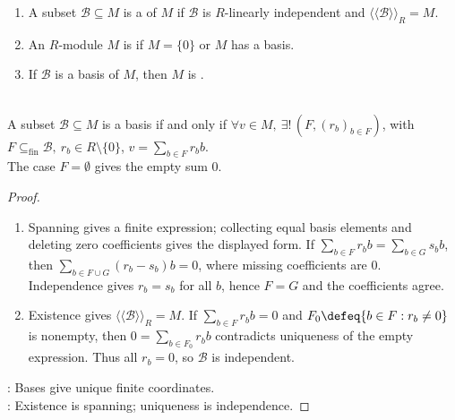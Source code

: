 \begin{definition} \label{def:free-module-basis} 
\begin{enumerate}[label=(\roman*)]
\setlength{\itemsep}{0pt}
\item A subset $\mathcal{B}\subseteq M$ is a  of $M$ if $\mathcal{B}$ is $R$-linearly independent and $\langle\!\langle\mathcal{B}\rangle\!\rangle_R=M$.
\item An $R$-module $M$ is  if $M=\{0\}$ or $M$ has a basis.
\item If $\mathcal{B}$ is a basis of $M$, then $M$ is .
\end{enumerate}
\end{definition}

\begin{theorem} \label{thm:module-basis-unique-coordinates} \\
A subset $\mathcal{B}\subseteq M$ is a basis if and only if $\forall v\in M,\ \exists!\,(F,(r_b)_{b\in F})$, with $F\subseteq_{\operatorname{fin}}\mathcal{B},\ r_b\in R\setminus\{0\}$, $v=\sum\limits_{b\in F}r_bb$.\\
The case $F=\emptyset$ gives the empty sum $0$.
\begin{proof}
\begin{enumerate}[label=\roman*.]
\setlength{\itemsep}{0pt}
\item[$(\Rightarrow)$] Spanning gives a finite expression; collecting equal basis elements and deleting zero coefficients gives the displayed form. If $\sum\limits_{b\in F}r_bb=\sum\limits_{b\in G}s_bb$, then $\sum\limits_{b\in F\cup G}(r_b-s_b)b=0$, where missing coefficients are $0$.\\
Independence gives $r_b=s_b$ for all $b$, hence $F=G$ and the coefficients agree.
\item[$(\Leftarrow)$] Existence gives $\langle\!\langle\mathcal{B}\rangle\!\rangle_R=M$. If $\sum\limits_{b\in F}r_bb=0$ and $F_0\defeq\{b\in F:r_b\neq0\}$ is nonempty, then $0=\sum\limits_{b\in F_0}r_bb$ contradicts uniqueness of the empty expression. Thus all $r_b=0$, so $\mathcal{B}$ is independent.
\end{enumerate}
: Bases give unique finite coordinates.\\
: Existence is spanning; uniqueness is independence.
\end{proof}
\end{theorem}

